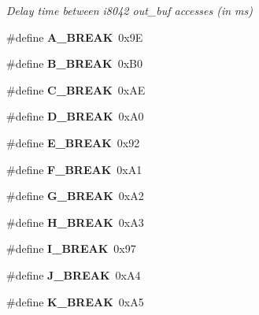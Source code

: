 \begin{DoxyCompactItemize}
\begin{DoxyCompactList}\small\item\em Delay time between i8042 out\+\_\+buf accesses (in ms) \end{DoxyCompactList}\item 
\hypertarget{group__i8042_ga05826112c5acf959ee58dcacd8e9d065}{}\label{group__i8042_ga05826112c5acf959ee58dcacd8e9d065} 
\#define {\bfseries A\+\_\+\+B\+R\+E\+AK}~0x9E
\item 
\hypertarget{group__i8042_gab71f0412d1074dd1639b80cb4212b3f3}{}\label{group__i8042_gab71f0412d1074dd1639b80cb4212b3f3} 
\#define {\bfseries B\+\_\+\+B\+R\+E\+AK}~0x\+B0
\item 
\hypertarget{group__i8042_ga1db17ab74e715b3e1265635a2eb94825}{}\label{group__i8042_ga1db17ab74e715b3e1265635a2eb94825} 
\#define {\bfseries C\+\_\+\+B\+R\+E\+AK}~0x\+AE
\item 
\hypertarget{group__i8042_gad2db9242348c43c781cc14746060470b}{}\label{group__i8042_gad2db9242348c43c781cc14746060470b} 
\#define {\bfseries D\+\_\+\+B\+R\+E\+AK}~0x\+A0
\item 
\hypertarget{group__i8042_gac311aa1d8ee6267fad12d4a8569e2ce9}{}\label{group__i8042_gac311aa1d8ee6267fad12d4a8569e2ce9} 
\#define {\bfseries E\+\_\+\+B\+R\+E\+AK}~0x92
\item 
\hypertarget{group__i8042_gabb14a7c6bdb0f1773fb6c4712a935e89}{}\label{group__i8042_gabb14a7c6bdb0f1773fb6c4712a935e89} 
\#define {\bfseries F\+\_\+\+B\+R\+E\+AK}~0x\+A1
\item 
\hypertarget{group__i8042_ga540965f25f8be58638386fb7e0217da0}{}\label{group__i8042_ga540965f25f8be58638386fb7e0217da0} 
\#define {\bfseries G\+\_\+\+B\+R\+E\+AK}~0x\+A2
\item 
\hypertarget{group__i8042_gab5cf6dcc56896464b68482927d5626cb}{}\label{group__i8042_gab5cf6dcc56896464b68482927d5626cb} 
\#define {\bfseries H\+\_\+\+B\+R\+E\+AK}~0x\+A3
\item 
\hypertarget{group__i8042_gadbd5495a5a7584ce408afc77053a1a6e}{}\label{group__i8042_gadbd5495a5a7584ce408afc77053a1a6e} 
\#define {\bfseries I\+\_\+\+B\+R\+E\+AK}~0x97
\item 
\hypertarget{group__i8042_ga9503cf55f6fa08d947698b7ba9396063}{}\label{group__i8042_ga9503cf55f6fa08d947698b7ba9396063} 
\#define {\bfseries J\+\_\+\+B\+R\+E\+AK}~0x\+A4
\item 
\hypertarget{group__i8042_ga977fbee87f9a0e17cca83f5e9c0c40c5}{}\label{group__i8042_ga977fbee87f9a0e17cca83f5e9c0c40c5} 
\#define {\bfseries K\+\_\+\+B\+R\+E\+AK}~0x\+A5

\end{DoxyCompactItemize}
